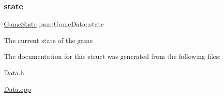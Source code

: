 \subsubsection{\texorpdfstring{state}{state}}
{\footnotesize\ttfamily \hyperlink{namespacepan_a6f99370eda3b27c2bbe19b2dacea9212}{Game\+State} pan\+::\+Game\+Data\+::state}

The current state of the game 

The documentation for this struct was generated from the following files\+:\begin{DoxyCompactItemize}
\item 
\hyperlink{_data_8h}{Data.\+h}\item 
\hyperlink{_data_8cpp}{Data.\+cpp}\end{DoxyCompactItemize}

